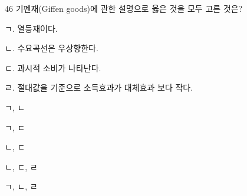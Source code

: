 \begin{question}{46}
기펜재(Giffen goods)에 관한 설명으로 옳은 것을 모두 고른 것은?
\begin{framedtext}
ㄱ. 열등재이다. \par
ㄴ. 수요곡선은 우상향한다. \par
ㄷ. 과시적 소비가 나타난다. \par
ㄹ. 절대값을 기준으로 소득효과가 대체효과 보다 작다. \par
\end{framedtext}
\begin{choices}
  \item ㄱ, ㄴ
  \item ㄱ, ㄷ
  \item ㄴ, ㄷ
  \item ㄴ, ㄷ, ㄹ
  \item ㄱ, ㄴ, ㄹ
\end{choices}
\end{question}
